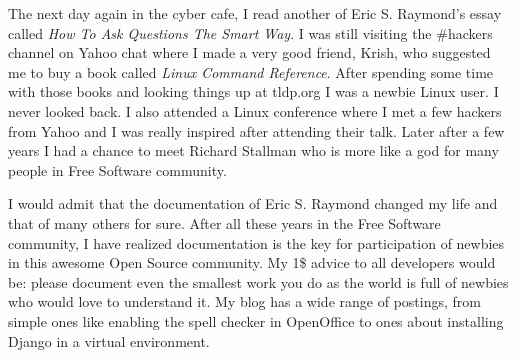 The next day again in the cyber cafe, I read another of Eric S. Raymond's essay
called \textit{How To Ask Questions The Smart Way}. I was still visiting the \#hackers channel on
Yahoo chat where I made a very good friend, Krish, who suggested me to
buy a book called \textit{Linux Command Reference}. After spending some time
with those books and looking things up at tldp.org I was a newbie
Linux user. I never looked back. I also attended a Linux conference
where I met a few hackers from Yahoo and I was really inspired after
attending their talk. Later after a few years I had a chance to meet Richard Stallman
who is more like a god for many people in Free Software community.

I would admit that the documentation of Eric S. Raymond changed my life and that of
many others for sure. After all these years in the Free Software
community, I have realized documentation is the key for participation
of newbies in this awesome Open Source community. My 1\$ advice to all
developers would be: please document even the smallest work you do as the world
is full of newbies who would love to understand it. My blog has a wide range of
postings, from simple ones like enabling the spell checker in OpenOffice
to ones about installing Django in a virtual environment.
